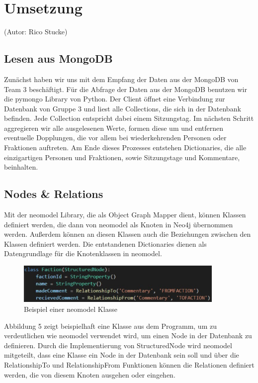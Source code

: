 \section{Umsetzung}\label{sec:04_03_umsetzung}
(Autor: Rico Stucke)
\subsection{Lesen aus MongoDB}
Zunächst haben wir uns mit dem Empfang der Daten aus der MongoDB von Team 3 beschäftigt. Für die Abfrage der Daten aus der MongoDB benutzen wir die pymongo Library von Python. Der Client öffnet eine Verbindung zur Datenbank von Gruppe 3 und liest alle Collections, die sich in der Datenbank befinden. Jede Collection entspricht dabei einem Sitzungstag. Im nächsten Schritt aggregieren wir alle ausgelesenen Werte, formen diese um und entfernen eventuelle Dopplungen, die vor allem bei wiederkehrenden Personen oder Fraktionen auftreten. Am Ende dieses Prozesses entstehen Dictionaries, die alle einzigartigen Personen und Fraktionen, sowie Sitzungstage und Kommentare, beinhalten.
\subsection{Nodes \& Relations}
Mit der neomodel Library, die als Object Graph Mapper dient, können Klassen definiert werden, die dann von neomodel als Knoten in Neo4j übernommen werden. Außerdem können an diesen Klassen auch die Beziehungen zwischen den Klassen definiert werden. Die entstandenen Dictionaries dienen als Datengrundlage für die Knotenklassen in neomodel.
\begin{figure}[htb]
    \centering
    \includegraphics[width=10cm]{chapters/05-Interaktion-Abgeord/faction.jpg} 
    \caption{Beispiel einer neomodel Klasse}
    \label{fig:chapters/05-Interaktion-Abgeord/faction.jpg}
\end{figure}
Abbildung 5 zeigt beispielhaft eine Klasse aus dem Programm, um zu verdeutlichen wie neomodel verwendet wird, um einen Node in der Datenbank zu definieren. Durch die Implementierung von StructuredNode wird neomodel mitgeteilt, dass eine Klasse ein Node in der Datenbank sein soll und über die RelationshipTo und RelationshipFrom Funktionen können die Relationen definiert werden, die von diesem Knoten ausgehen oder eingehen.
